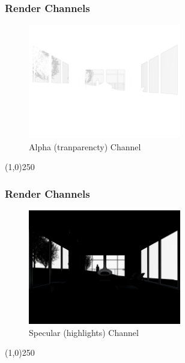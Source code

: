 \begin{frame}
\frametitle{Render Channels}
\begin{figure}
	\centering
	\includegraphics[height=5cm]{./img/Rendering/SittingRoomFinalAlpha.png}
	\caption[Alpha (tranparencty) Channel]{Alpha (tranparencty) Channel}
	\label{fig:sittingroomfinalAlpha}
\end{figure}
\end{frame}
\begin{center}\line(1,0){250}\end{center}






\begin{frame}
\frametitle{Render Channels}
\begin{figure}
	\centering
	\includegraphics[height=5cm]{./img/Rendering/SittingRoomFinalSpecular.png}
	\caption[Specular (highlights) Channel]{Specular (highlights) Channel}
	\label{fig:sittingroomfinalSpecular}
\end{figure}
\end{frame}
\begin{center}\line(1,0){250}\end{center}

